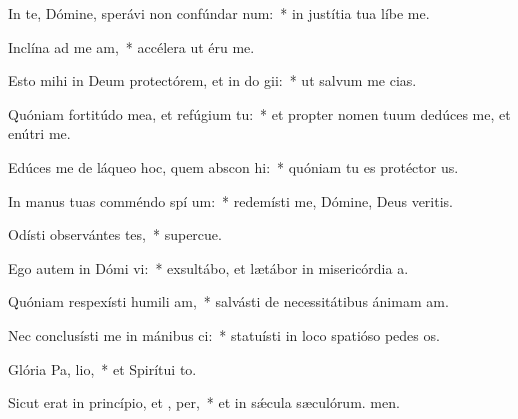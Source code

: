 \item In te, Dómine, sperávi non confúndar  num:~* in justítia tua líbe me.
\item Inclína ad me  am,~* accélera ut éru me.
\item Esto mihi in Deum protectórem, et in do gii:~* ut salvum me cias.
\item Quóniam fortitúdo mea, et refúgium   tu:~* et propter nomen tuum dedúces me, et enútri me.
\item Edúces me de láqueo hoc, quem abscon hi:~* quóniam tu es protéctor us.
\item In manus tuas comméndo spí um:~* redemísti me, Dómine, Deus veritis.
\item Odísti observántes tes,~* supercue.
\item Ego autem in Dómi vi:~* exsultábo, et lætábor in misericórdia a.
\item Quóniam respexísti humili am,~* salvásti de necessitátibus ánimam am.
\item Nec conclusísti me in mánibus ci:~* statuísti in loco spatióso pedes os.
\item Glória Pa,  lio,~* et Spirítui to.
\item Sicut erat in princípio, et ,  per,~* et in sǽcula sæculórum. men.
